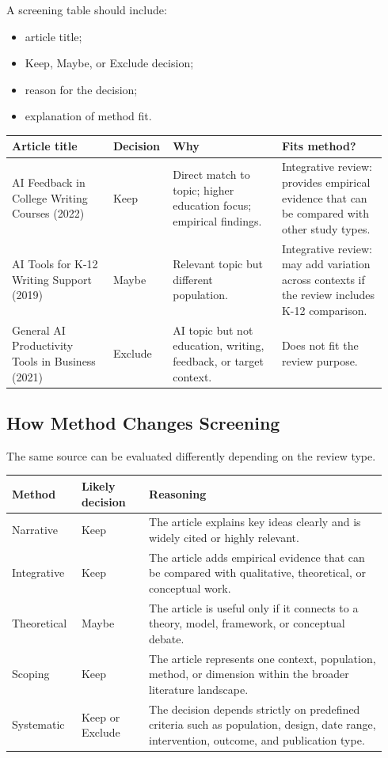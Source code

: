 \documentclass[11pt,letterpaper]{article}
\begin{document}
A screening table should include:

\begin{itemize}
  \item article title;
  \item Keep, Maybe, or Exclude decision;
  \item reason for the decision;
  \item explanation of method fit.
\end{itemize}

\begin{longtable}{@{}p{0.26\linewidth}p{0.12\linewidth}p{0.29\linewidth}p{0.27\linewidth}@{}}
\toprule
\textbf{Article title} & \textbf{Decision} & \textbf{Why} & \textbf{Fits method?}\\
\midrule
AI Feedback in College Writing Courses (2022) & Keep & Direct match to topic; higher education focus; empirical findings. & Integrative review: provides empirical evidence that can be compared with other study types.\\
AI Tools for K-12 Writing Support (2019) & Maybe & Relevant topic but different population. & Integrative review: may add variation across contexts if the review includes K-12 comparison.\\
General AI Productivity Tools in Business (2021) & Exclude & AI topic but not education, writing, feedback, or target context. & Does not fit the review purpose.\\
\bottomrule
\end{longtable}

\subsection{How Method Changes Screening}

The same source can be evaluated differently depending on the review type.

\begin{longtable}{@{}p{0.17\linewidth}p{0.17\linewidth}p{0.60\linewidth}@{}}
\toprule
\textbf{Method} & \textbf{Likely decision} & \textbf{Reasoning}\\
\midrule
Narrative & Keep & The article explains key ideas clearly and is widely cited or highly relevant.\\
Integrative & Keep & The article adds empirical evidence that can be compared with qualitative, theoretical, or conceptual work.\\
Theoretical & Maybe & The article is useful only if it connects to a theory, model, framework, or conceptual debate.\\
Scoping & Keep & The article represents one context, population, method, or dimension within the broader literature landscape.\\
Systematic & Keep or Exclude & The decision depends strictly on predefined criteria such as population, design, date range, intervention, outcome, and publication type.\\
\bottomrule
\end{longtable}
\end{document}
